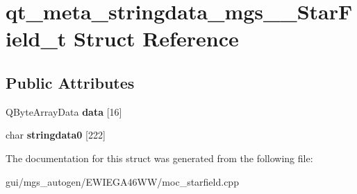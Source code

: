 \hypertarget{structqt__meta__stringdata__mgs____StarField__t}{}\section{qt\+\_\+meta\+\_\+stringdata\+\_\+mgs\+\_\+\+\_\+\+Star\+Field\+\_\+t Struct Reference}
\label{structqt__meta__stringdata__mgs____StarField__t}
\subsection*{Public Attributes}
\begin{DoxyCompactItemize}
\item 
\mbox{\label{structqt__meta__stringdata__mgs____StarField__t_ab7649ffd014d55ffcf1a0aa1b5ba7ad3}} 
Q\+Byte\+Array\+Data {\bfseries data} \mbox{[}16\mbox{]}
\item 
\mbox{\label{structqt__meta__stringdata__mgs____StarField__t_a51f9ca7794f727ac4a7ee175e5305753}} 
char {\bfseries stringdata0} \mbox{[}222\mbox{]}
\end{DoxyCompactItemize}


The documentation for this struct was generated from the following file\+:\begin{DoxyCompactItemize}
\item 
gui/mgs\+\_\+autogen/\+E\+W\+I\+E\+G\+A46\+W\+W/moc\+\_\+starfield.\+cpp\end{DoxyCompactItemize}
